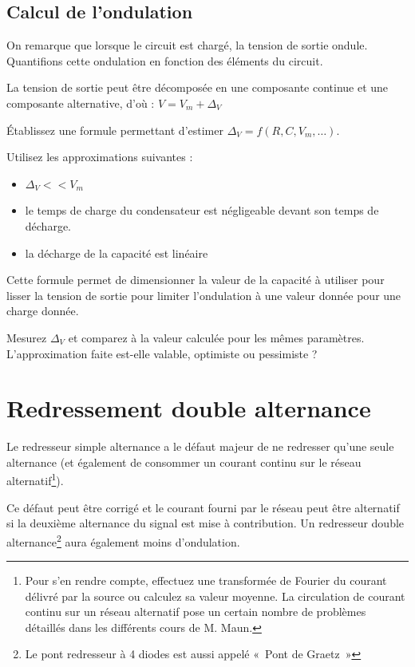 \documentclass{../template/labo}
\begin{document}
\subsection{Calcul de l'ondulation}
On remarque que lorsque le circuit est chargé, la tension de sortie ondule. Quantifions cette ondulation en fonction des éléments du circuit.

La tension de sortie peut être décomposée en une composante continue et une composante alternative, d'où : $V=V_m+\Delta_V$

\Question
{
	Établissez une formule permettant d'estimer $\Delta_V=f(R,C, V_m,\dots)$. %
	
	Utilisez les approximations suivantes :
	\begin{itemize}
	\item $\Delta_V<<V_m$
	\item le temps de charge du condensateur est négligeable devant son temps de décharge.
	\item la décharge de la capacité est linéaire
	\end{itemize}
}
{}%
	\label{Q:14}


Cette formule permet de dimensionner la valeur de la capacité à utiliser pour lisser la tension de sortie pour limiter l'ondulation à une valeur donnée pour une charge donnée.

\Question
{
	Mesurez $\Delta_V$ et comparez à la valeur calculée pour les mêmes paramètres. L'approximation faite est-elle valable, optimiste ou pessimiste ?
}
{}%
	\label{Q:15}

\newpage
\section{Redressement double alternance}

Le redresseur simple alternance a le défaut majeur de ne redresser qu'une seule alternance (et également de consommer un courant continu sur le réseau alternatif\footnote{Pour s'en rendre compte, effectuez une transformée de Fourier du courant délivré par la source ou calculez sa valeur moyenne. La circulation de courant continu sur un réseau alternatif pose un certain nombre de problèmes détaillés dans les différents cours de M. Maun.}).

Ce défaut peut être corrigé et le courant fourni par le réseau peut être alternatif si la deuxième alternance du signal est mise à contribution. Un redresseur double alternance\footnote{Le pont redresseur à 4 diodes est aussi appelé «~Pont de Graetz~»}  aura également moins d'ondulation.
\end{document}
